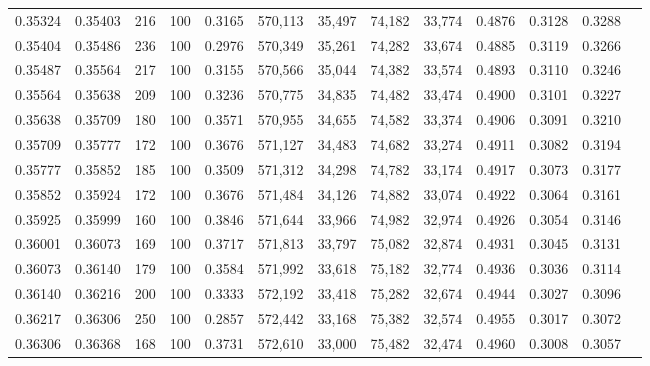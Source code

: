 \begin{tabular}{rrrrrrrrrrrrr}
0.35324 & 0.35403 &   216 & 100 &                                     0.3165 & 570,113 &  35,497 &  74,182 &  33,774 & 0.4876 & 0.3128 & 0.3288 \\
0.35404 & 0.35486 &   236 & 100 &                                     0.2976 & 570,349 &  35,261 &  74,282 &  33,674 & 0.4885 & 0.3119 & 0.3266 \\
0.35487 & 0.35564 &   217 & 100 &                                     0.3155 & 570,566 &  35,044 &  74,382 &  33,574 & 0.4893 & 0.3110 & 0.3246 \\
0.35564 & 0.35638 &   209 & 100 &                                     0.3236 & 570,775 &  34,835 &  74,482 &  33,474 & 0.4900 & 0.3101 & 0.3227 \\
0.35638 & 0.35709 &   180 & 100 &                                     0.3571 & 570,955 &  34,655 &  74,582 &  33,374 & 0.4906 & 0.3091 & 0.3210 \\
0.35709 & 0.35777 &   172 & 100 &                                     0.3676 & 571,127 &  34,483 &  74,682 &  33,274 & 0.4911 & 0.3082 & 0.3194 \\
0.35777 & 0.35852 &   185 & 100 &                                     0.3509 & 571,312 &  34,298 &  74,782 &  33,174 & 0.4917 & 0.3073 & 0.3177 \\
0.35852 & 0.35924 &   172 & 100 &                                     0.3676 & 571,484 &  34,126 &  74,882 &  33,074 & 0.4922 & 0.3064 & 0.3161 \\
0.35925 & 0.35999 &   160 & 100 &                                     0.3846 & 571,644 &  33,966 &  74,982 &  32,974 & 0.4926 & 0.3054 & 0.3146 \\
0.36001 & 0.36073 &   169 & 100 &                                     0.3717 & 571,813 &  33,797 &  75,082 &  32,874 & 0.4931 & 0.3045 & 0.3131 \\
0.36073 & 0.36140 &   179 & 100 &                                     0.3584 & 571,992 &  33,618 &  75,182 &  32,774 & 0.4936 & 0.3036 & 0.3114 \\
0.36140 & 0.36216 &   200 & 100 &                                     0.3333 & 572,192 &  33,418 &  75,282 &  32,674 & 0.4944 & 0.3027 & 0.3096 \\
0.36217 & 0.36306 &   250 & 100 &                                     0.2857 & 572,442 &  33,168 &  75,382 &  32,574 & 0.4955 & 0.3017 & 0.3072 \\
0.36306 & 0.36368 &   168 & 100 &                                     0.3731 & 572,610 &  33,000 &  75,482 &  32,474 & 0.4960 & 0.3008 & 0.3057 \\

\end{tabular}
